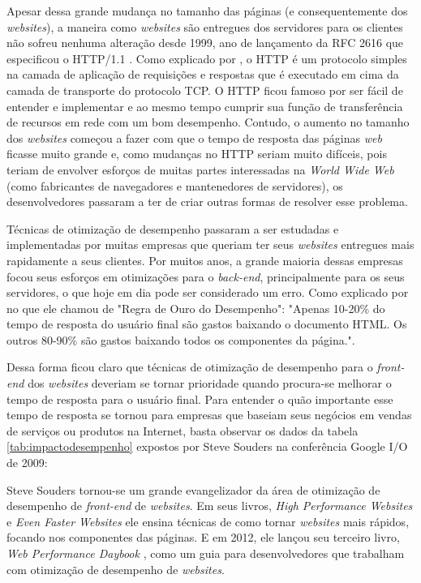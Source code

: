 Apesar dessa grande mudança no tamanho das páginas (e consequentemente dos \textit{websites}), a maneira como \textit{websites} são entregues dos servidores para os clientes não sofreu nenhuma alteração desde 1999, ano de lançamento da RFC 2616 que especificou o HTTP/1.1 \cite{RFC2616}. Como explicado por \cite{Tanenbaum}, o HTTP é um protocolo simples na camada de aplicação de requisições e respostas que é executado em cima da camada de transporte do protocolo TCP. O HTTP ficou famoso por ser fácil de entender e implementar e ao mesmo tempo cumprir sua função de transferência de recursos em rede com um bom desempenho. Contudo, o aumento no tamanho dos \textit{websites} começou a fazer com que o tempo de resposta das páginas \textit{web} ficasse muito grande e, como mudanças no HTTP seriam muito difíceis, pois teriam de envolver esforços de muitas partes interessadas na \textit{World Wide Web} (como fabricantes de navegadores e mantenedores de servidores), os desenvolvedores passaram a ter de criar outras formas de resolver esse problema.

Técnicas de otimização de desempenho passaram a ser estudadas e implementadas por muitas empresas que queriam ter seus \textit{websites} entregues mais rapidamente a seus clientes. Por muitos anos, a grande maioria dessas empresas focou seus esforços em otimizações para o \textit{back-end}, principalmente para os seus servidores, o que hoje em dia pode ser considerado um erro. Como explicado por  no que ele chamou de "Regra de Ouro do Desempenho": "Apenas 10-20\% do tempo de resposta do usuário final são gastos baixando o documento HTML. Os outros 80-90\% são gastos baixando todos os componentes da página.".

Dessa forma ficou claro que técnicas de otimização de desempenho para o \textit{front-end} dos \textit{websites} deveriam se tornar prioridade quando procura-se melhorar o tempo de resposta para o usuário final. Para entender o quão importante esse tempo de resposta se tornou para empresas que baseiam seus negócios em vendas de serviços ou produtos na Internet, basta observar os dados da tabela \autoref{tab:impactodesempenho} expostos por Steve Souders na conferência Google I/O de 2009:



Steve Souders tornou-se um grande evangelizador da área de otimização de desempenho de \textit{front-end} de \textit{websites}. Em seus livros, \textit{High Performance Websites} \cite{HighPerformance} e \textit{Even Faster Websites} \cite{EvenFaster} ele ensina técnicas de como tornar \textit{websites} mais rápidos, focando nos componentes das páginas. E em 2012, ele lançou seu terceiro livro, \textit{Web Performance Daybook} \cite{WebPerformance}, como um guia para desenvolvedores que trabalham com otimização de desempenho de \textit{websites}.

